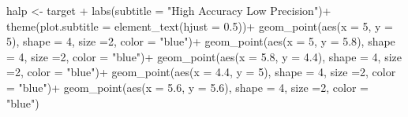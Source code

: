 \documentclass[
  letterpaper,
  DIV=11,
  numbers=noendperiod]{scrreprt}
\newenvironment{Shaded}{\begin{snugshade}}{\end{snugshade}}
\newcommand{\AttributeTok}[1]{\textcolor[rgb]{0.40,0.45,0.13}{#1}}
\newcommand{\DecValTok}[1]{\textcolor[rgb]{0.68,0.00,0.00}{#1}}
\newcommand{\FloatTok}[1]{\textcolor[rgb]{0.68,0.00,0.00}{#1}}
\newcommand{\FunctionTok}[1]{\textcolor[rgb]{0.28,0.35,0.67}{#1}}
\newcommand{\NormalTok}[1]{\textcolor[rgb]{0.00,0.23,0.31}{#1}}
\newcommand{\OtherTok}[1]{\textcolor[rgb]{0.00,0.23,0.31}{#1}}
\newcommand{\SpecialCharTok}[1]{\textcolor[rgb]{0.37,0.37,0.37}{#1}}
\newcommand{\StringTok}[1]{\textcolor[rgb]{0.13,0.47,0.30}{#1}}
\begin{document}
\begin{Shaded}
\begin{Highlighting}[]
\NormalTok{halp }\OtherTok{\textless{}{-}}\NormalTok{ target }\SpecialCharTok{+}
  \FunctionTok{labs}\NormalTok{(}\AttributeTok{subtitle =} \StringTok{"High Accuracy Low Precision"}\NormalTok{)}\SpecialCharTok{+}
  \FunctionTok{theme}\NormalTok{(}\AttributeTok{plot.subtitle =} \FunctionTok{element\_text}\NormalTok{(}\AttributeTok{hjust =} \FloatTok{0.5}\NormalTok{))}\SpecialCharTok{+}
  \FunctionTok{geom\_point}\NormalTok{(}\FunctionTok{aes}\NormalTok{(}\AttributeTok{x =} \DecValTok{5}\NormalTok{, }\AttributeTok{y =} \DecValTok{5}\NormalTok{), }\AttributeTok{shape =} \DecValTok{4}\NormalTok{, }\AttributeTok{size =}\DecValTok{2}\NormalTok{, }\AttributeTok{color =} \StringTok{"blue"}\NormalTok{)}\SpecialCharTok{+}
  \FunctionTok{geom\_point}\NormalTok{(}\FunctionTok{aes}\NormalTok{(}\AttributeTok{x =} \DecValTok{5}\NormalTok{, }\AttributeTok{y =} \FloatTok{5.8}\NormalTok{), }\AttributeTok{shape =} \DecValTok{4}\NormalTok{, }\AttributeTok{size =}\DecValTok{2}\NormalTok{, }\AttributeTok{color =} \StringTok{"blue"}\NormalTok{)}\SpecialCharTok{+}
  \FunctionTok{geom\_point}\NormalTok{(}\FunctionTok{aes}\NormalTok{(}\AttributeTok{x =} \FloatTok{5.8}\NormalTok{, }\AttributeTok{y =} \FloatTok{4.4}\NormalTok{), }\AttributeTok{shape =} \DecValTok{4}\NormalTok{, }\AttributeTok{size =}\DecValTok{2}\NormalTok{, }\AttributeTok{color =} \StringTok{"blue"}\NormalTok{)}\SpecialCharTok{+}
  \FunctionTok{geom\_point}\NormalTok{(}\FunctionTok{aes}\NormalTok{(}\AttributeTok{x =} \FloatTok{4.4}\NormalTok{, }\AttributeTok{y =} \DecValTok{5}\NormalTok{), }\AttributeTok{shape =} \DecValTok{4}\NormalTok{, }\AttributeTok{size =}\DecValTok{2}\NormalTok{, }\AttributeTok{color =} \StringTok{"blue"}\NormalTok{)}\SpecialCharTok{+}
  \FunctionTok{geom\_point}\NormalTok{(}\FunctionTok{aes}\NormalTok{(}\AttributeTok{x =} \FloatTok{5.6}\NormalTok{, }\AttributeTok{y =} \FloatTok{5.6}\NormalTok{), }\AttributeTok{shape =} \DecValTok{4}\NormalTok{, }\AttributeTok{size =}\DecValTok{2}\NormalTok{, }\AttributeTok{color =} \StringTok{"blue"}\NormalTok{)}


\end{Highlighting}
\end{Shaded}
\end{document}
